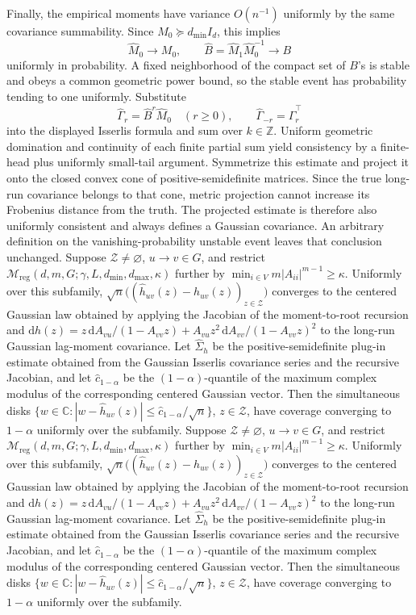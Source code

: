 Finally, the empirical moments have variance \(O(n^{-1})\) uniformly by the same covariance summability.  Since \(M_0\succeq d_{\min}I_d\), this implies
\[
 \widehat M_0\longrightarrow M_0,\qquad
 \widehat B=\widehat M_1\widehat M_0^{-1}\longrightarrow B
\]
uniformly in probability.  A fixed neighborhood of the compact set of \(B\)'s is stable and obeys a common geometric power bound, so the stable event has probability tending to one uniformly.  Substitute
\[
 \widehat\Gamma_r=\widehat B^r\widehat M_0\quad(r\ge0),\qquad
 \widehat\Gamma_{-r}=\widehat\Gamma_r^\top
\]
into the displayed Isserlis formula and sum over \(k\in\mathbb Z\).  Uniform geometric domination and continuity of each finite partial sum yield consistency by a finite-head plus uniformly small-tail argument.  Symmetrize this estimate and project it onto the closed convex cone of positive-semidefinite matrices.  Since the true long-run covariance belongs to that cone, metric projection cannot increase its Frobenius distance from the truth.  The projected estimate is therefore also uniformly consistent and always defines a Gaussian covariance.  An arbitrary definition on the vanishing-probability unstable event leaves that conclusion unchanged.
Suppose \(\mathcal Z\ne\varnothing\), \(u\to v\in G\), and restrict \(\mathcal M_{\mathrm{reg}}(d,m,G;\gamma,L,d_{\min},d_{\max},\kappa)\) further by \(\min_{i\in V}m|A_{ii}|^{m-1}\ge\kappa\). Uniformly over this subfamily, \(\sqrt n\big((\widehat h_{uv}(z)-h_{uv}(z))_{z\in\mathcal Z}\big)\) converges to the centered Gaussian law obtained by applying the Jacobian of the moment-to-root recursion and \(\mathrm dh(z)=z\,\mathrm dA_{vu}/(1-A_{vv}z)+A_{vu}z^2\,\mathrm dA_{vv}/(1-A_{vv}z)^2\) to the long-run Gaussian lag-moment covariance. Let \(\widehat\Sigma_h\) be the positive-semidefinite plug-in estimate obtained from the Gaussian Isserlis covariance series and the recursive Jacobian, and let \(\widehat c_{1-\alpha}\) be the \((1-\alpha)\)-quantile of the maximum complex modulus of the corresponding centered Gaussian vector. Then the simultaneous disks \(\{w\in\mathbb C:|w-\widehat h_{uv}(z)|\le \widehat c_{1-\alpha}/\sqrt n\}\), \(z\in\mathcal Z\), have coverage converging to \(1-\alpha\) uniformly over the subfamily.
Suppose \(\mathcal Z\ne\varnothing\), \(u\to v\in G\), and restrict \(\mathcal M_{\mathrm{reg}}(d,m,G;\gamma,L,d_{\min},d_{\max},\kappa)\) further by \(\min_{i\in V}m|A_{ii}|^{m-1}\ge\kappa\). Uniformly over this subfamily, \(\sqrt n\big((\widehat h_{uv}(z)-h_{uv}(z))_{z\in\mathcal Z}\big)\) converges to the centered Gaussian law obtained by applying the Jacobian of the moment-to-root recursion and \(\mathrm dh(z)=z\,\mathrm dA_{vu}/(1-A_{vv}z)+A_{vu}z^2\,\mathrm dA_{vv}/(1-A_{vv}z)^2\) to the long-run Gaussian lag-moment covariance. Let \(\widehat\Sigma_h\) be the positive-semidefinite plug-in estimate obtained from the Gaussian Isserlis covariance series and the recursive Jacobian, and let \(\widehat c_{1-\alpha}\) be the \((1-\alpha)\)-quantile of the maximum complex modulus of the corresponding centered Gaussian vector. Then the simultaneous disks \(\{w\in\mathbb C:|w-\widehat h_{uv}(z)|\le \widehat c_{1-\alpha}/\sqrt n\}\), \(z\in\mathcal Z\), have coverage converging to \(1-\alpha\) uniformly over the subfamily.
